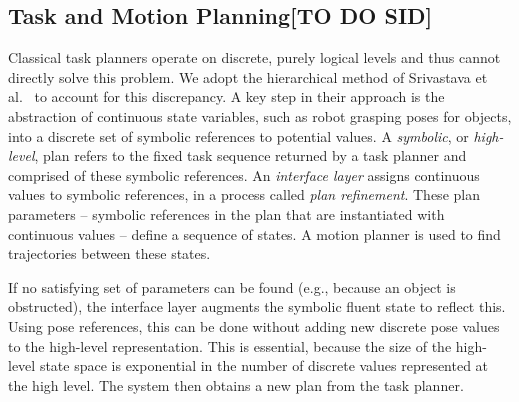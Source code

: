 
\subsection{Task and Motion Planning[TO DO SID]}
Classical task planners operate on discrete, purely logical levels and thus cannot directly
solve this problem. We adopt the hierarchical method of Srivastava et al.~\cite{srivastava2014combined}
to account for this discrepancy. A key step in their approach is the
abstraction of continuous state variables, such as robot grasping poses for objects, into a
discrete set of symbolic references to potential values. A \emph{symbolic}, or \emph{high-level}, plan
refers to the fixed task sequence returned by a task planner and comprised of these symbolic references.
An \emph{interface layer} assigns continuous values to symbolic references, in a process called \emph{plan refinement}.
These plan parameters -- symbolic references in the plan that are instantiated with continuous values --
define a sequence of states. A motion planner is used to find trajectories between these states.

If no satisfying set of parameters can be found (e.g., because an object is obstructed), the interface layer
augments the symbolic fluent state to reflect this. Using pose references,
this can be done without adding new discrete pose values to the high-level representation.
This is essential, because the size of the high-level state space is exponential in the number of discrete
values represented at the high level. The system then obtains a new plan from the task planner.

